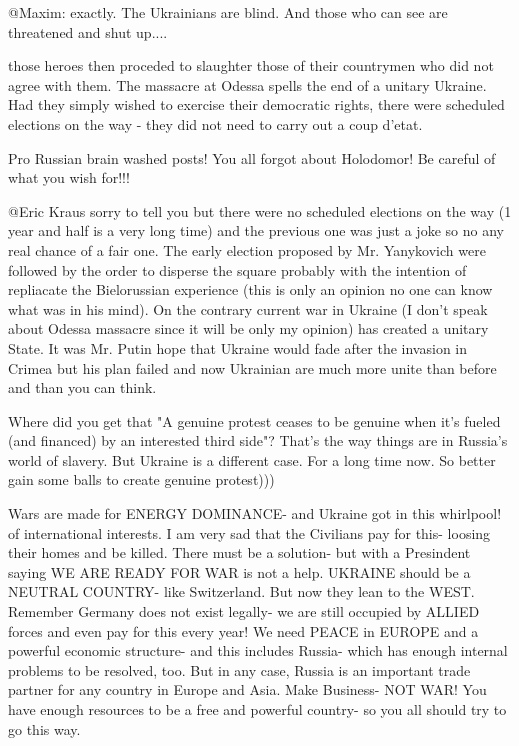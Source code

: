 \begin{itemize}
\begin{itemize}

@Maxim: exactly. The Ukrainians are blind. And those who can see are threatened
and shut up....


those heroes then proceded to slaughter those of their countrymen who did not
agree with them. The massacre at Odessa spells the end of a unitary Ukraine.
Had they simply wished to exercise their democratic rights, there were
scheduled elections on the way - they did not need to carry out a coup d'etat.


Pro Russian brain washed posts! You all forgot about Holodomor! Be careful of what you wish for!!!


@Eric Kraus sorry to tell you but there were no scheduled elections on the way
(1 year and half is a very long time) and the previous one was just a joke so
no any real chance of a fair one. The early election proposed by Mr. Yanykovich
were followed by the order to disperse the square probably with the intention
of repliacate the Bielorussian experience (this is only an opinion no one can
know what was in his mind). On the contrary current war in Ukraine (I don't
speak about Odessa massacre since it will be only my opinion) has created a
unitary State. It was Mr. Putin hope that Ukraine would fade after the invasion
in Crimea but his plan failed and now Ukrainian are much more unite than before
and than you can think.



Where did you get that "A genuine protest ceases to be genuine when it's fueled
(and financed) by an interested third side"? That's the way things are in
Russia's world of slavery. But Ukraine is a different case. For a long time
now. So better gain some balls to create genuine protest)))


Wars are made for ENERGY DOMINANCE- and Ukraine got in this whirlpool! of
international interests. I am very sad that the Civilians pay for this- loosing
their homes and be killed. There must be a solution- but with a Presindent
saying WE ARE READY FOR WAR is not a help. UKRAINE should be a NEUTRAL COUNTRY-
like Switzerland. But now they lean to the WEST. Remember Germany does not
exist legally- we are still occupied by ALLIED forces and even pay for this
every year! We need PEACE in EUROPE and a powerful economic structure- and this
includes Russia- which has enough internal problems to be resolved, too. But in
any case, Russia is an important trade partner for any country in Europe and
Asia. Make Business- NOT WAR! You have enough resources to be a free and
powerful country- so you all should try to go this way.


\end{itemize}
\end{itemize}
